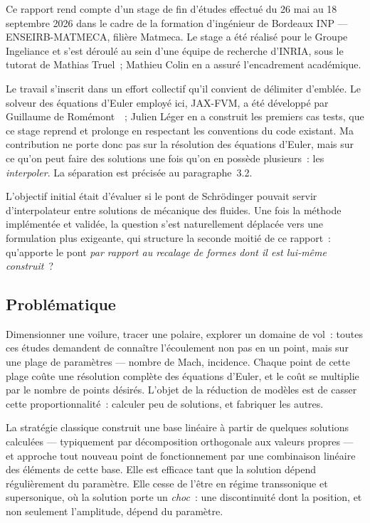\documentclass[11pt,a4paper]{article}
\begin{document}
Ce rapport rend compte d'un stage de fin d'études effectué du 26 mai au 18 septembre
2026 dans le cadre de la formation d'ingénieur de Bordeaux INP --- ENSEIRB-MATMECA,
filière Matmeca. Le stage a été réalisé pour le Groupe Ingeliance et s'est déroulé au
sein d'une équipe de recherche d'INRIA, sous le tutorat de Mathias Truel~; Mathieu Colin
en a assuré l'encadrement académique.

Le travail s'inscrit dans un effort collectif qu'il convient de délimiter d'emblée. Le
solveur des équations d'Euler employé ici, JAX-FVM, a été développé par Guillaume de
Romémont~\cite{deromemont2026jaxfvm}~; Julien Léger en a construit les premiers cas
tests, que ce stage reprend et prolonge en respectant les conventions du code existant.
Ma contribution ne porte donc pas sur la résolution des équations d'Euler, mais sur ce
qu'on peut faire des solutions une fois qu'on en possède plusieurs~: les
\emph{interpoler}. La séparation est précisée au paragraphe~3.2.

L'objectif initial était d'évaluer si le pont de Schrödinger pouvait servir
d'interpolateur entre solutions de mécanique des fluides. Une fois la méthode
implémentée et validée, la question s'est naturellement déplacée vers une formulation
plus exigeante, qui structure la seconde moitié de ce rapport~: qu'apporte le pont
\emph{par rapport au recalage de formes dont il est lui-même construit}~?

\subsection{Problématique}
\label{sec:problematique}

Dimensionner une voilure, tracer une polaire, explorer un domaine de vol~: toutes ces
études demandent de connaître l'écoulement non pas en un point, mais sur une plage de
paramètres --- nombre de Mach, incidence. Chaque point de cette plage coûte une
résolution complète des équations d'Euler, et le coût se multiplie par le nombre de
points désirés. L'objet de la réduction de modèles est de casser cette
proportionnalité~: calculer peu de solutions, et fabriquer les autres.

La stratégie classique construit une base linéaire à partir de quelques solutions
calculées --- typiquement par décomposition orthogonale aux valeurs propres --- et
approche tout nouveau point de fonctionnement par une combinaison linéaire des éléments
de cette base. Elle est efficace tant que la solution dépend régulièrement du paramètre.
Elle cesse de l'être en régime transsonique et supersonique, où la solution porte un
\emph{choc}~: une discontinuité dont la position, et non seulement l'amplitude, dépend du
paramètre.
\end{document}
